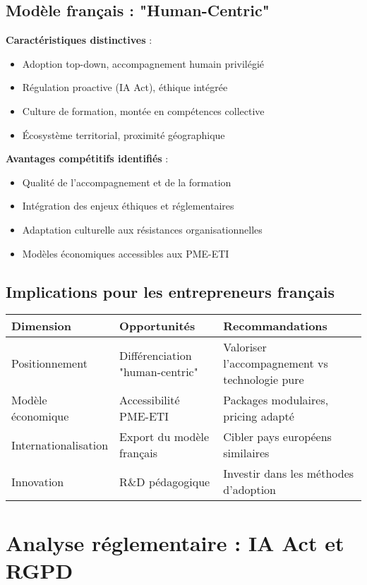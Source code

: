\subsection{Modèle français : "Human-Centric"}

\textbf{Caractéristiques distinctives} :
\begin{itemize}
    \item Adoption top-down, accompagnement humain privilégié
    \item Régulation proactive (IA Act), éthique intégrée
    \item Culture de formation, montée en compétences collective
    \item Écosystème territorial, proximité géographique
\end{itemize}

\textbf{Avantages compétitifs identifiés} :
\begin{itemize}
    \item Qualité de l'accompagnement et de la formation
    \item Intégration des enjeux éthiques et réglementaires
    \item Adaptation culturelle aux résistances organisationnelles
    \item Modèles économiques accessibles aux PME-ETI
\end{itemize}

\subsection{Implications pour les entrepreneurs français}

\begin{longtable}{@{}p{4cm}p{5cm}p{5cm}@{}}
\toprule
\textbf{Dimension} & \textbf{Opportunités} & \textbf{Recommandations} \\
\midrule
Positionnement & Différenciation "human-centric" & Valoriser l'accompagnement vs technologie pure \\
Modèle économique & Accessibilité PME-ETI & Packages modulaires, pricing adapté \\
Internationalisation & Export du modèle français & Cibler pays européens similaires \\
Innovation & R\&D pédagogique & Investir dans les méthodes d'adoption \\
\bottomrule
\end{longtable}

\section{Analyse réglementaire : IA Act et RGPD}

